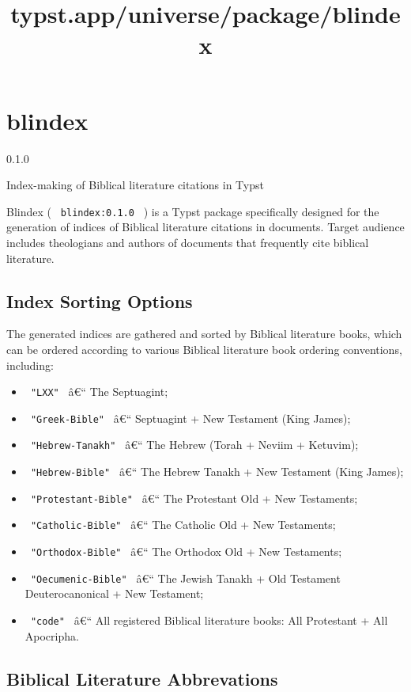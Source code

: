 \title{typst.app/universe/package/blindex}

\label{banner}
\section{blindex}\label{blindex}

{ 0.1.0 }

Index-making of Biblical literature citations in Typst

\label{readme}
Blindex ( \texttt{\ blindex:0.1.0\ } ) is a Typst package specifically
designed for the generation of indices of Biblical literature citations
in documents. Target audience includes theologians and authors of
documents that frequently cite biblical literature.

\subsection{Index Sorting Options}\label{index-sorting-options}

The generated indices are gathered and sorted by Biblical literature
books, which can be ordered according to various Biblical literature
book ordering conventions, including:

\begin{itemize}
\tightlist
\item
  \texttt{\ "LXX"\ } â€`` The Septuagint;
\item
  \texttt{\ "Greek-Bible"\ } â€`` Septuagint + New Testament (King
  James);
\item
  \texttt{\ "Hebrew-Tanakh"\ } â€`` The Hebrew (Torah + Neviim +
  Ketuvim);
\item
  \texttt{\ "Hebrew-Bible"\ } â€`` The Hebrew Tanakh + New Testament
  (King James);
\item
  \texttt{\ "Protestant-Bible"\ } â€`` The Protestant Old + New
  Testaments;
\item
  \texttt{\ "Catholic-Bible"\ } â€`` The Catholic Old + New Testaments;
\item
  \texttt{\ "Orthodox-Bible"\ } â€`` The Orthodox Old + New Testaments;
\item
  \texttt{\ "Oecumenic-Bible"\ } â€`` The Jewish Tanakh + Old Testament
  Deuterocanonical + New Testament;
\item
  \texttt{\ "code"\ } â€`` All registered Biblical literature books: All
  Protestant + All Apocripha.
\end{itemize}

\subsection{Biblical Literature
Abbrevations}\label{biblical-literature-abbrevations}

